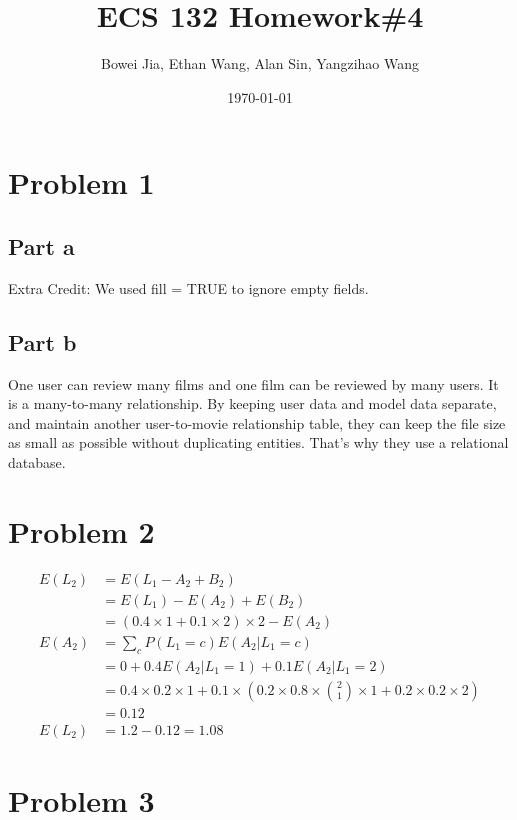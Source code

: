 \documentclass[11pt]{article}
\title{ECS 132 Homework\#4}
\author{Bowei Jia, Ethan Wang, Alan Sin, Yangzihao Wang}
\date{\today}
\begin{document}
\maketitle
\section*{Problem 1}
\subsection*{Part a}
Extra Credit: We used fill = TRUE to ignore empty fields.
\subsection*{Part b}
One user can review many films and one film can be reviewed by many users.
It is a many-to-many relationship. By keeping user data and model data separate,
and maintain another user-to-movie relationship table, they can keep the file
size as small as possible without duplicating entities. That's why they use a relational database.
\section*{Problem 2}
\begin{align*}
E(L_2) &= E(L_1 - A_2 + B_2) \\
&=E(L_1) - E(A_2) + E(B_2) \\
&=(0.4\times 1 + 0.1\times 2) \times 2 - E(A_2) \\
E(A_2) &= \sum_{c}P(L_1=c)E(A_2|L_1=c) \\
&=0 + 0.4E(A_2|L_1=1) + 0.1E(A_2|L_1=2) \\
&=0.4 \times 0.2 \times 1 + 0.1 \times (0.2 \times 0.8 \times \binom{2}{1} \times 1 + 0.2 \times 0.2 \times 2) \\
&= 0.12\\
E(L_2) &= 1.2 - 0.12 = 1.08
\end{align*}

\section*{Problem 3}
\end{document}
